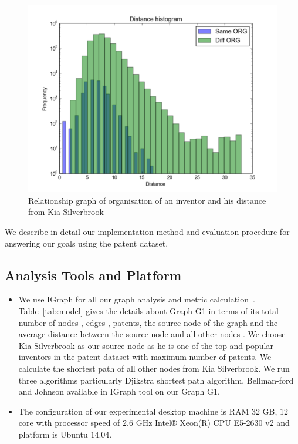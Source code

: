\begin{figure}[t]
  \includegraphics[scale=0.425]{figure/same_diff_org.pdf}
  \caption{ Relationship graph of organisation of an inventor and his distance from Kia Silverbrook}
\label{fig:same_diff}
\end{figure}

We describe in detail our implementation method and evaluation procedure for
answering  our goals using the patent dataset. 

\subsection{Analysis Tools and Platform}


	\begin{itemize}
		\squish
		\item We use IGraph for all our graph analysis and metric
		calculation~\cite{gephi, igraph}. Table~\ref{tab:model} gives the details
		about Graph G1 in terms of its total number of nodes , edges , patents, the
		source node  of the graph and the average distance between the source node and
		all other nodes .    We choose Kia Silverbrook as our source node as he is one
		of the top and popular inventors in the patent dataset with maximum number of
		patents. We calculate the shortest path of all other nodes from Kia Silverbrook.
		We run three algorithms particularly Djikstra shortest path algorithm,
		Bellman-ford and Johnson available in IGraph tool on our Graph G1.
		\item The configuration of our experimental desktop machine is RAM $32$ GB, $12$
		core with processor speed of $2.6$ GHz Intel® Xeon(R) CPU E5-2630 v2 and platform is Ubuntu $14.04$.
	\end{itemize}

